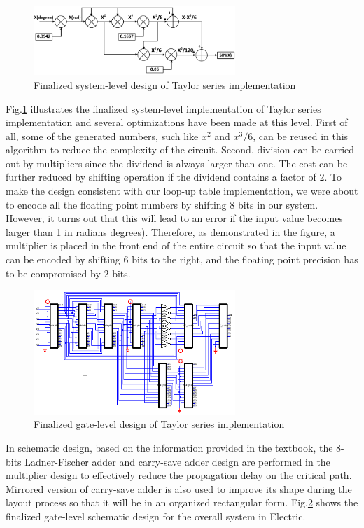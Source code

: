 \documentclass[10pt,journal]{IEEEtran}
\begin{document}
\begin{figure}[h]
\centering
\includegraphics[width=3in]{finalized_design.png}
\caption{Finalized system-level design of Taylor series implementation}
\label{finalized_design}
\end{figure}

Fig.\ref{finalized_design} illustrates the finalized system-level implementation of Taylor series implementation and several optimizations have been made at this level. First of all, some of the generated numbers, such like $x^2$ and $x^3/6$, can be reused in this algorithm to reduce the complexity of the circuit. Second, division can be carried out by multipliers since the dividend is always larger than one. The cost can be further reduced by shifting operation if the dividend contains a factor of 2. To make the design consistent with our loop-up table implementation, we were about to encode all the floating point numbers by shifting 8 bits in our system. However, it turns out that this will lead to an error if the input value becomes larger than 1 in radians degrees). Therefore, as demonstrated in the figure, a multiplier is placed in the front end of the entire circuit so that the input value can be encoded by shifting 6 bits to the right, and the floating point precision has to be compromised by 2 bits.

\begin{figure}[h]
\centering
\includegraphics[width=3in]{finalized_gate_design.png}
\caption{Finalized gate-level design of Taylor series implementation}
\label{finalized_gate_design}
\end{figure}

In schematic design, based on the information provided in the textbook, the 8-bits Ladner-Fischer adder and carry-save adder design are performed in the multiplier design to effectively reduce the propagation delay on the critical path. Mirrored version of carry-save adder is also used to improve its shape during the layout process so that it will be in an organized rectangular form. Fig.\ref{finalized_gate_design} shows the finalized gate-level schematic design for the overall system in Electric.
\end{document}
